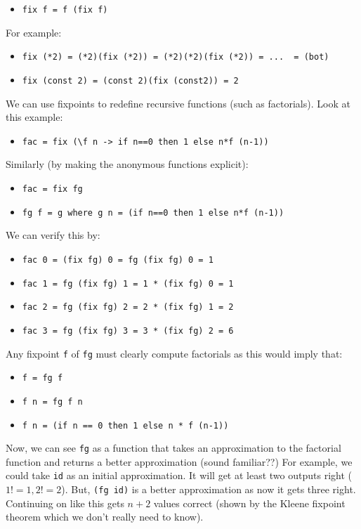 \documentclass[11pt,a4paper,headsepline,titlepage,dvipsnames,cmyk]{scrartcl}
\begin{document}
\begin{itemize}
    \item \lstinline|fix f = f (fix f)| 
\end{itemize}

For example:
\begin{itemize}
    \item \lstinline|fix (*2) = (*2)(fix (*2)) = (*2)(*2)(fix (*2)) = ...  = (bot)|
    \item \lstinline|fix (const 2) = (const 2)(fix (const2)) = 2| 
\end{itemize}

We can use fixpoints to redefine recursive functions (such as factorials).
Look at this example:
\begin{itemize}
    \item \lstinline|fac = fix (\f n -> if n==0 then 1 else n*f (n-1))| 
\end{itemize}

Similarly (by making the anonymous functions explicit):
\begin{itemize}
    \item \lstinline|fac = fix fg| 
    \item \lstinline|fg f = g where g n = (if n==0 then 1 else n*f (n-1))| 
\end{itemize}

We can verify this by:
\begin{itemize}
    \item \lstinline|fac 0 = (fix fg) 0 = fg (fix fg) 0 = 1| 
    \item \lstinline|fac 1 = fg (fix fg) 1 = 1 * (fix fg) 0 = 1| 
    \item \lstinline|fac 2 = fg (fix fg) 2 = 2 * (fix fg) 1 = 2| 
    \item \lstinline|fac 3 = fg (fix fg) 3 = 3 * (fix fg) 2 = 6| 
\end{itemize}

Any fixpoint \lstinline|f| of \lstinline|fg| must clearly compute
factorials as this would imply that:
\begin{itemize}
    \item \lstinline|f = fg f|
    \item \lstinline|f n = fg f n| 
    \item \lstinline|f n = (if n == 0 then 1 else n * f (n-1))|
\end{itemize}

Now, we can see \lstinline|fg| as a function that takes an approximation
to the factorial function and returns a better approximation (sound
familiar??) For example, we could take \lstinline|id| as an initial
approximation. It will get at least two outputs right ($1! = 1, 2! = 2$).
But, \lstinline|(fg id)|  is a better approximation as now it gets three
right. Continuing on like this gets $n+2$ values correct (shown by the
Kleene fixpoint theorem which we don't really need to know).
\end{document}
